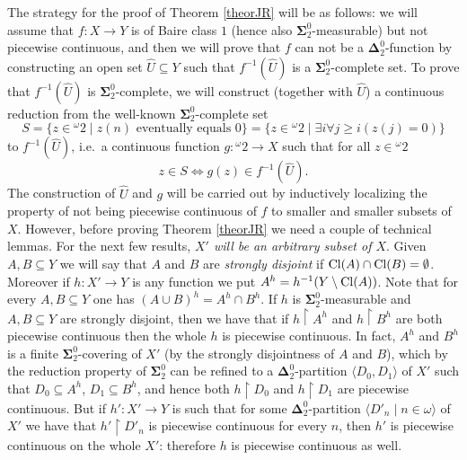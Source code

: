\documentclass{rae}
\def\Cl{{\rm Cl}}
\newcommand{\Can}{\ensuremath{{}^\omega 2}}
\newcommand{\bSigma}{\mathbf{\Sigma}}
\newcommand{\bDelta}{\mathbf{\Delta}}
\newcommand{\restr}[2]{#1 \restriction #2}
\newcommand{\seq}[2]{\langle #1 \mid  #2 \rangle}
\theoremstyle{definition}
\begin{document}
The strategy for the proof of Theorem \ref{theorJR} will be as follows: we will assume that $f \colon X \to Y$ is of Baire class $1$ (hence also $\bSigma^0_2$-measurable) but not piecewise continuous, and then we will prove that $f$ can not be a $\bDelta^0_2$-function by constructing an open set $\hat{U} \subseteq Y$\label{Ug} such that $f^{-1}(\hat{U})$ is a $\bSigma^0_2$-complete set. To prove that $f^{-1}(\hat{U})$ is $\bSigma^0_2$-complete, we will construct (together with $\hat{U}$) a continuous reduction from the well-known $\bSigma^0_2$-complete set 
\[ S = \{ z \in \Can \mid z(n) \text{ eventually equals }0\} = \{ z \in \Can \mid \exists i \forall j \geq i (z(j)=0)\} \]
 to $f^{-1}(\hat{U})$, i.e.\ a continuous function $g \colon \Can \to X$ such that for all $z \in \Can$
\[ z \in S \iff g(z) \in f^{-1}(\hat{U}).\]
The construction of $\hat{U}$ and $g$ will be carried out by inductively localizing the property of not being piecewise continuous of $f$ to smaller and smaller subsets of $X$.
However, 
before proving Theorem \ref{theorJR} we need a
 couple of technical lemmas.
For the next few results,
 \emph{$X'$ will be an arbitrary subset of  $X$}. 
Given $A,B \subseteq Y$ we will say that $A$ and $B$ are \emph{strongly 
disjoint} if $\Cl(A) \cap \Cl(B) = \emptyset$. Moreover 
if $h \colon X' \to Y$ is any function we put $A^h = h^{-1}(Y \setminus 
\Cl(A))$. Note that for every $A,B \subseteq Y$ one has $(A \cup B)^h
= A^h \cap B^h$. If $h$ is $\bSigma^0_2$-measurable and 
$A,B \subseteq Y$ are strongly disjoint, then we have that if 
$\restr{h}{A^h}$ and $\restr{h}{B^h}$ are both piecewise continuous then 
the whole $h$ is piecewise
continuous. In fact, $A^h$ and $B^h$ is a finite 
$\bSigma^0_2$-covering of $X'$ (by the strongly 
disjointness of $A$ and $B$), which by the reduction property of 
$\bSigma^0_2$ can be refined to a $\bDelta^0_2$-partition $\langle D_0, 
D_1 \rangle$ of $X'$ such that $D_0 \subseteq A^h$, 
$D_1 \subseteq B^h$, and hence both $\restr{h}{D_0}$ and 
$\restr{h}{D_1}$ are piecewise continuous. But if $h'\colon X' \to Y$ is 
such that for some $\bDelta^0_2$-partition $\seq{D'_n}{n \in \omega}$ of 
$X'$ we have that $\restr{h'}{D'_n}$ is piecewise continuous  for every 
$n$, then $h'$ is piecewise continuous on the whole $X'$: therefore $h$ 
is piecewise continuous as well.
\end{document}

